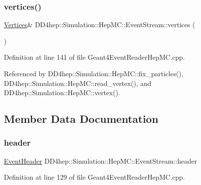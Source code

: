 \subsubsection{\texorpdfstring{vertices()}{vertices()}}
{\footnotesize\ttfamily \hyperlink{class_d_d4hep_1_1_simulation_1_1_hep_m_c_1_1_event_stream_a3e270d38edde8369e52ad396615a2755}{Vertices}\& D\+D4hep\+::\+Simulation\+::\+Hep\+M\+C\+::\+Event\+Stream\+::vertices (\begin{DoxyParamCaption}{ }\end{DoxyParamCaption})\hspace{0.3cm}{\ttfamily [inline]}}



Definition at line 141 of file Geant4\+Event\+Reader\+Hep\+M\+C.\+cpp.



Referenced by D\+D4hep\+::\+Simulation\+::\+Hep\+M\+C\+::fix\+\_\+particles(), D\+D4hep\+::\+Simulation\+::\+Hep\+M\+C\+::read\+\_\+vertex(), and D\+D4hep\+::\+Simulation\+::\+Hep\+M\+C\+::vertex().



\subsection{Member Data Documentation}
\hypertarget{class_d_d4hep_1_1_simulation_1_1_hep_m_c_1_1_event_stream_ac60c5b73780a0d523e2042a93610dfe3}{}\label{class_d_d4hep_1_1_simulation_1_1_hep_m_c_1_1_event_stream_ac60c5b73780a0d523e2042a93610dfe3} 
\subsubsection{\texorpdfstring{header}{header}}
{\footnotesize\ttfamily \hyperlink{class_d_d4hep_1_1_simulation_1_1_hep_m_c_1_1_event_header}{Event\+Header} D\+D4hep\+::\+Simulation\+::\+Hep\+M\+C\+::\+Event\+Stream\+::header}



Definition at line 129 of file Geant4\+Event\+Reader\+Hep\+M\+C.\+cpp.

\hypertarget{class_d_d4hep_1_1_simulation_1_1_hep_m_c_1_1_event_stream_a2702d64e41d9b280f84ebbae47521125}{}\label{class_d_d4hep_1_1_simulation_1_1_hep_m_c_1_1_event_stream_a2702d64e41d9b280f84ebbae47521125} 
